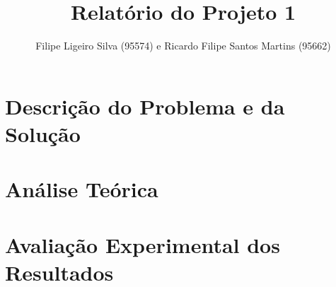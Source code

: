 \documentclass[a4paper, 12pt]{article}
\author{Filipe Ligeiro Silva (95574) e Ricardo Filipe Santos Martins (95662)}
\title{Relatório do Projeto 1}
\date{}
\begin{document}
\maketitle
\section*{Descrição do Problema e da Solução}
\section*{Análise Teórica}
\section*{Avaliação Experimental dos Resultados}
\end{document}
